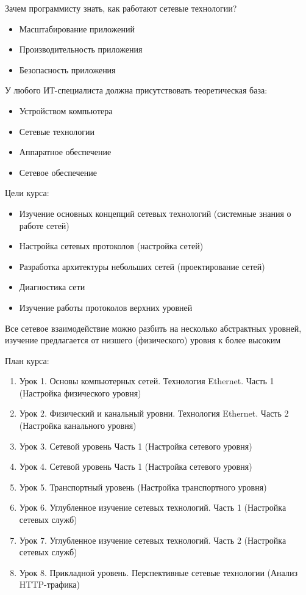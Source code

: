 \documentclass[a4paper]{article}
\begin{document}
Зачем программисту знать, как работают сетевые технологии?
\begin{itemize}
	\item Масштабирование приложений
	\item Производительность приложения
	\item Безопасность приложения
\end{itemize}

У любого ИТ-специалиста должна присутствовать теоретическая база:
\begin{itemize}
	\item Устройством компьютера 
	\item Сетевые технологии
	\item Аппаратное обеспечение
	\item Сетевое обеспечение
\end{itemize}

Цели курса:
\begin{itemize}
	\item Изучение основных концепций сетевых технологий (системные знания о работе сетей)
	\item Настройка сетевых протоколов (настройка сетей)
	\item Разработка архитектуры небольших сетей (проектирование сетей)
	\item Диагностика сети
	\item Изучение работы протоколов верхних уровней
\end{itemize}

Все сетевое взаимодействие можно разбить на несколько абстрактных уровней, изучение предлагается от низшего (физического) уровня к более высоким

План курса:
\begin{enumerate}
	\item Урок 1. Основы компьютерных сетей. Технология Ethernet. Часть 1 (Настройка физического уровня)
	\item Урок 2. Физический и канальный уровни. Технология Ethernet. Часть 2 (Настройка канального уровня)
	\item Урок 3. Сетевой уровень Часть 1 (Настройка сетевого уровня)
	\item Урок 4. Сетевой уровень Часть 1 (Настройка сетевого уровня)
	\item Урок 5. Транспортный уровень (Настройка транспортного уровня)
	\item Урок 6. Углубленное изучение сетевых технологий. Часть 1 (Настройка сетевых служб)
	\item Урок 7. Углубленное изучение сетевых технологий. Часть 2 (Настройка сетевых служб)
	\item Урок 8. Прикладной уровень. Перспективные сетевые технологии (Анализ HTTP-трафика)
\end{enumerate}
\end{document}
